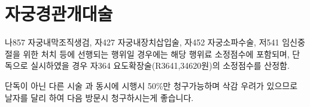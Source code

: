\section{자궁경관개대술}
%
{나857 자궁내막조직생검, 자427 자궁내장치삽입술, 자452 자궁소파수술, 저541 임신중절을 위한 처치 등에 선행되는 행위일 경우에는 해당 행위료 소정점수에 포함되며, 단독으로 실시하였을 경우
자364 요도확장술(R3641,34620원)의 소정점수를 산정함.\par 단독이 아닌 다른 시술 과 동시에 시행시 50\%만 청구가능하며 삭감 우려가 있으므로 날자를 달리 하여 다음 방문시 청구하시는게 좋습니다.}
